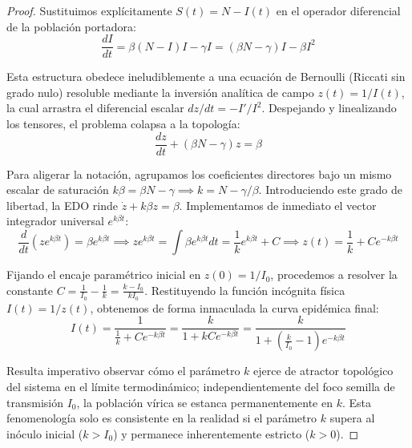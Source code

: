\documentclass[11pt,a4paper]{article}
\theoremstyle{definition}
\theoremstyle{plain}
\begin{document}
\begin{proof}
Sustituimos explícitamente $S(t) = N - I(t)$ en el operador diferencial de la población portadora:
\begin{equation}
    \frac{dI}{dt} = \beta(N - I)I - \gamma I = (\beta N - \gamma)I - \beta I^2
\end{equation}

Esta estructura obedece ineludiblemente a una ecuación de Bernoulli (Riccati sin grado nulo) resoluble mediante la inversión analítica de campo $z(t) = 1/I(t)$, la cual arrastra el diferencial escalar $dz/dt = -I'/I^2$.
Despejando y linealizando los tensores, el problema colapsa a la topología:
\begin{equation*}
    \frac{dz}{dt} + (\beta N - \gamma)z = \beta
\end{equation*}

Para aligerar la notación, agrupamos los coeficientes directores bajo un mismo escalar de saturación $k\beta = \beta N - \gamma \implies k = N - \gamma/\beta$. Introduciendo este grado de libertad, la EDO rinde $\dot{z} + k\beta z = \beta$. 
Implementamos de inmediato el vector integrador universal $e^{k\beta t}$:
\begin{equation*}
    \frac{d}{dt} \left( z e^{k\beta t} \right) = \beta e^{k\beta t} \implies z e^{k\beta t} = \int \beta e^{k\beta t} dt = \frac{1}{k} e^{k\beta t} + C \implies z(t) = \frac{1}{k} + C e^{-k\beta t}
\end{equation*}

Fijando el encaje paramétrico inicial en $z(0) = 1/I_0$, procedemos a resolver la constante $C = \frac{1}{I_0} - \frac{1}{k} = \frac{k - I_0}{k I_0}$. 
Restituyendo la función incógnita física $I(t) = 1/z(t)$, obtenemos de forma inmaculada la curva epidémica final:
\begin{equation*}
    I(t) = \frac{1}{\frac{1}{k} + C e^{-k\beta t}} = \frac{k}{1 + k C e^{-k\beta t}} = \frac{k}{1 + \left(\frac{k}{I_0} - 1\right) e^{-k\beta t}}
\end{equation*}

Resulta imperativo observar cómo el parámetro $k$ ejerce de atractor topológico del sistema en el límite termodinámico; independientemente del foco semilla de transmisión $I_0$, la población vírica se estanca permanentemente en $k$. Esta fenomenología solo es consistente en la realidad si el parámetro $k$ supera al inóculo inicial ($k > I_0$) y permanece inherentemente estricto ($k > 0$).
\end{proof}
\end{document}
